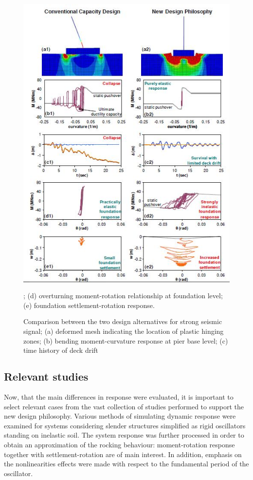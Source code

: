 \documentclass[12pt,a4paper]{report}
\begin{document}
\begin{figure}[h!]
	\centering
	\includegraphics[width=0.8\linewidth]{"conventional"}
	\caption{Comparison between the two design alternatives for strong seismic signal; (a) deformed mesh indicating the location of plastic hinging zones; (b) bending moment-curvature response at pier base level; (c) time history of deck drift}; (d) overturning moment-rotation relationship at foundation level; (e) foundation settlement-rotation response.
	\label{conventional}
\end{figure}



\newpage
\subsection{Relevant studies}
Now, that the main differences in response were evaluated, it is important to select \mbox{relevant} cases from the vast collection of studies performed to support the new design philosophy. Various methods of simulating dynamic response were examined for systems considering slender structures simplified as rigid oscillators standing on inelastic soil. The system response was further processed in order to obtain an approximation of the rocking \mbox{behaviour}: moment-rotation response together with settlement-rotation are of main \mbox{interest}. In addition, emphasis on the nonlinearities effects were made with respect to the fundamental period of the oscillator.
\end{document}
